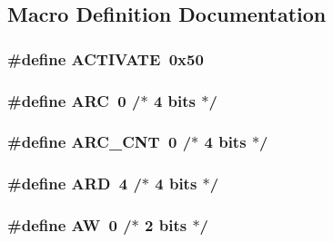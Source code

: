 \subsection{Macro Definition Documentation}
\hypertarget{a00013_ad37ed8e28abe573e992766b0e3b0353b}{
\subsubsection[{A\-C\-T\-I\-V\-A\-T\-E}]{\setlength{\rightskip}{0pt plus 5cm}\#define A\-C\-T\-I\-V\-A\-T\-E~0x50}}\label{a00013_ad37ed8e28abe573e992766b0e3b0353b}
\hypertarget{a00013_a14727f92df7a9466f732141f23b9c252}{
\subsubsection[{A\-R\-C}]{\setlength{\rightskip}{0pt plus 5cm}\#define A\-R\-C~0 /$\ast$ 4 bits $\ast$/}}\label{a00013_a14727f92df7a9466f732141f23b9c252}
\hypertarget{a00013_aaae5ef9927daf8a4939cd2ed6ffff2ec}{
\subsubsection[{A\-R\-C\-\_\-\-C\-N\-T}]{\setlength{\rightskip}{0pt plus 5cm}\#define A\-R\-C\-\_\-\-C\-N\-T~0 /$\ast$ 4 bits $\ast$/}}\label{a00013_aaae5ef9927daf8a4939cd2ed6ffff2ec}
\hypertarget{a00013_aa9701b150e0589afb638c82a498d1dcb}{
\subsubsection[{A\-R\-D}]{\setlength{\rightskip}{0pt plus 5cm}\#define A\-R\-D~4 /$\ast$ 4 bits $\ast$/}}\label{a00013_aa9701b150e0589afb638c82a498d1dcb}
\hypertarget{a00013_abd18e97392c5401ae01a906e1567da88}{
\subsubsection[{A\-W}]{\setlength{\rightskip}{0pt plus 5cm}\#define A\-W~0 /$\ast$ 2 bits $\ast$/}}\label{a00013_abd18e97392c5401ae01a906e1567da88}
